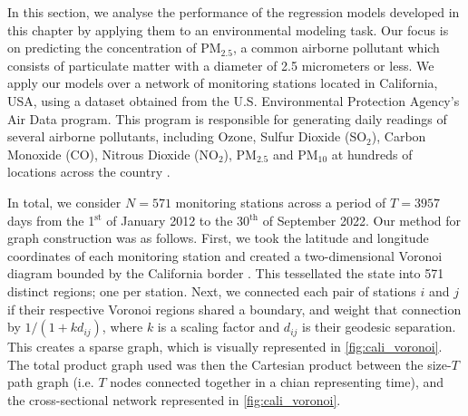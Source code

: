 In this section, we analyse the performance of the regression models developed in this chapter by applying them to an environmental modeling task. Our focus is on predicting the concentration of PM$_{2.5}$, a common airborne pollutant which consists of particulate matter with a diameter of 2.5 micrometers or less. We apply our models over a network of monitoring stations located in California, USA, using a dataset obtained from the U.S. Environmental Protection Agency's Air Data program. This program is responsible for generating daily readings of several airborne pollutants, including Ozone, Sulfur Dioxide (SO$_2$), Carbon Monoxide (CO), Nitrous Dioxide (NO$_2$), PM$_{2.5}$ and PM$_{10}$ at hundreds of locations across the country \citep{EPA2023}.  

In total, we consider $N=571$ monitoring stations across a period of $T=3957$ days from the 1$^\text{st}$ of January 2012 to the 30$^\text{th}$ of September 2022. Our method for graph construction was as follows. First, we took the latitude and longitude coordinates of each monitoring station and created a two-dimensional Voronoi diagram bounded by the California border \citep{Fortune1986}. This tessellated the state into 571 distinct regions; one per station. Next, we connected each pair of stations $i$ and $j$ if their respective Voronoi regions shared a boundary, and weight that connection by  $1 / (1 + kd_{ij})$, where $k$ is a scaling factor and $d_{ij}$ is their geodesic separation. This creates a sparse graph, which is visually represented in \cref{fig:cali_voronoi}. The total product graph used was then the Cartesian product between the size-$T$ path graph (i.e. $T$ nodes connected together in a chian representing time), and the cross-sectional network represented in \cref{fig:cali_voronoi}. 

